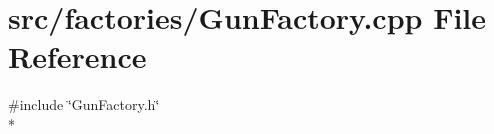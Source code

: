\section{src/factories/\-Gun\-Factory.cpp File Reference}
\label{_gun_factory_8cpp}
{\ttfamily \#include \char`\"{}Gun\-Factory.\-h\char`\"{}}\\*
